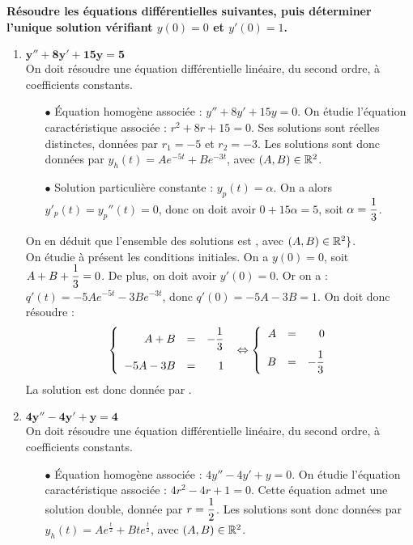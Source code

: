 \documentclass[a4paper, 11pt,reqno]{article}
\begin{document}
\begin{correction}  \;
\textbf{R\'esoudre les \'equations diff\'erentielles suivantes, puis d\'eterminer l'unique solution v\'erifiant $y(0)=0$ et $y'(0)=1$.}
\begin{enumerate}
\item $\mathbf{y''+8y'+15y=5}$\\ 
On doit r\'esoudre une \'equation diff\'erentielle lin\'eaire, du second ordre, \`a coefficients constants.
\begin{itemize}
\item[$\bullet$] \'Equation homog\`ene associ\'ee : $ y''+8y'+15y= 0$. On \'etudie l'\'equation caract\'eristique associ\'ee : $r^2 + 8r+15=0$. Ses solutions sont r\'eelles distinctes, donn\'ees par $r_1=-5$ et $r_2=-3$. Les solutions sont donc donn\'ees par $y_h(t) = A e^{-5t} + B e^{-3t}$, avec $(A,B) \in \mathbb{R}^2$.
\item[$\bullet$] Solution particuli\`ere constante : $y_p(t) = \alpha$. On a alors $y'_p(t) = y_p''(t) = 0$, donc on doit avoir $0 +15 \alpha = 5$, soit $\alpha = \displaystyle \frac{1}{3}$.
\end{itemize}
On en d\'eduit que l'ensemble des solutions est , avec $(A,B) \in \mathbb{R}^2\}$.\\ 
On \'etudie \`a pr\'esent les conditions initiales. On a $y(0) = 0$, soit $A+B+\displaystyle \frac{1}{3}=0$. De plus, on doit avoir $y'(0)=0$. Or on a : $q'(t) = - 5 A  e^{-5t} - 3 B e^{-3t}$, donc $q'(0) = -5A-3B = 1$. On doit donc r\'esoudre :
$$\left\{ \begin{array}{rcr}
A+B & = & -\ddp \frac{1}{3} \vsec\\
-5A -3B & = & 1
\end{array} \right. \; \Leftrightarrow \left\{ \begin{array}{rcr}
A & = & 0 \vsec\\
B & = & -\ddp \frac{1}{3}
\end{array} \right. $$
La solution est donc donn\'ee par  .
\item $\mathbf{4y''-4y'+y=4}$\\
On doit r\'esoudre une \'equation diff\'erentielle lin\'eaire, du second ordre, \`a coefficients constants.
\begin{itemize}
\item[$\bullet$] \'Equation homog\`ene associ\'ee : $ 4y''-4y'+y= 0$. On \'etudie l'\'equation caract\'eristique associ\'ee : $4r^2 -4r+1=0$. Cette \'equation admet une solution double, donn\'ee par $r=\displaystyle \frac{1}{2}$. Les solutions sont donc donn\'ees par $y_h(t) = A e^{\frac{t}{2}} + B t e^{\frac{t}{2}}$, avec $(A,B) \in \mathbb{R}^2$.

\end{itemize}
\end{enumerate}
\end{correction}
\end{document}

